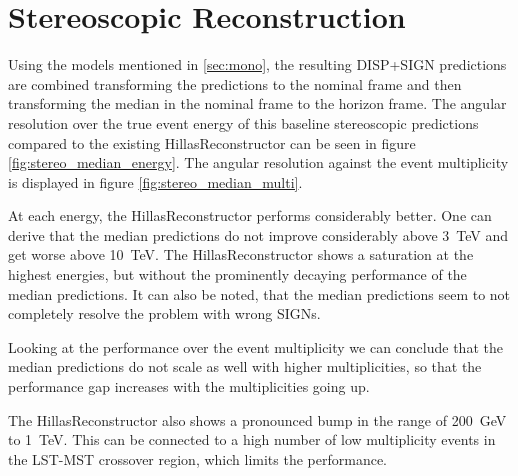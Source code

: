 

\section{Stereoscopic Reconstruction}\label{position}

Using the models mentioned in \ref{sec:mono}, the resulting DISP+SIGN predictions
are combined transforming the predictions to the nominal frame and then
transforming the median in the nominal frame to the horizon frame.
The angular resolution over the true event energy of this baseline stereoscopic predictions
compared to the existing HillasReconstructor can be seen in figure \ref{fig:stereo_median_energy}.
The angular resolution against the event multiplicity is displayed in figure \ref{fig:stereo_median_multi}.

At each energy, the HillasReconstructor performs considerably better.
One can derive that the median predictions do not improve considerably above
\SI{3}{\tera\electronvolt} and get worse above \SI{10}{\tera\electronvolt}.
The HillasReconstructor shows a saturation at the highest energies,
but without the prominently decaying performance of the median predictions.
It can also be noted, that the median predictions seem to not completely
resolve the problem with wrong SIGNs.

Looking at the performance over the event multiplicity we can conclude that the median predictions
do not scale as well with higher multiplicities, so that the performance gap increases with
the multiplicities going up.

The HillasReconstructor also shows a pronounced bump in the range of \SI{200}{\giga\electronvolt}
to \SI{1}{\tera\electronvolt}. 
This can be connected to a high number of low multiplicity events in the
LST-MST crossover region, which limits the performance.

